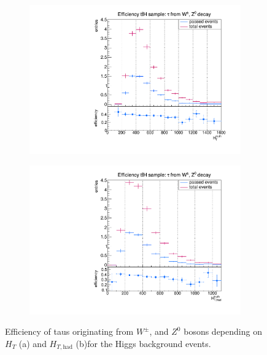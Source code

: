 \begin{figure}
  \centering
                \begin{subfigure}[t]{0.49\textwidth}
                \includegraphics[width=\textwidth]{figures/plots/ttH/Divided_promptHT.pdf}
                \label{Divided:prompt:HT}
                \end{subfigure}
                \begin{subfigure}[t]{0.49\textwidth}
                \includegraphics[width=\textwidth]{figures/plots/ttH/Divided_promptHThad.pdf}
                \label{Divided:prompt:HThad}
                \end{subfigure}
\caption[Efficiency of taus originating from $W^\pm$, and $Z^0$ bosons for the Higgs background events.]{Efficiency of taus originating from $W^\pm$, and $Z^0$ bosons depending on $H_{T}$ (a) and $H_{T,\text{had}}$ (b)for the Higgs background events.}
\label{Divided:prompt:HTgedöns}
\end{figure}
